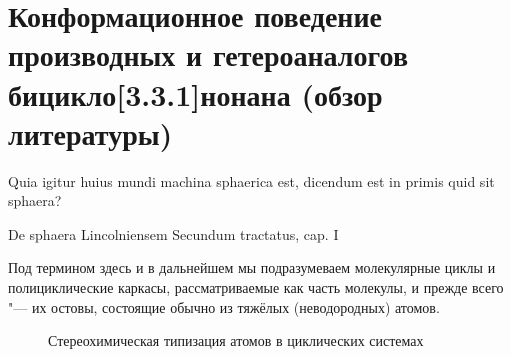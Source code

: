 \chapter{Конформационное поведение производных и гетероаналогов бицикло[3.3.1]нонана (обзор литературы)}\label{ch:Review:Basics}

\epigraph{Quia igitur huius mundi machina sphaerica est, dicendum est in primis quid sit sphaera?}{De sphaera Lincolniensem Secundum tractatus, cap. I}

Под термином  здесь и в дальнейшем мы подразумеваем молекулярные циклы и полициклические каркасы, рассматриваемые как часть молекулы, и прежде всего "--- их остовы, состоящие обычно из тяжёлых (неводородных) атомов.

\begin{figure}
  \caption{Стереохимическая типизация атомов в циклических системах\label{fig:Atom:Types}}

\end{figure}
